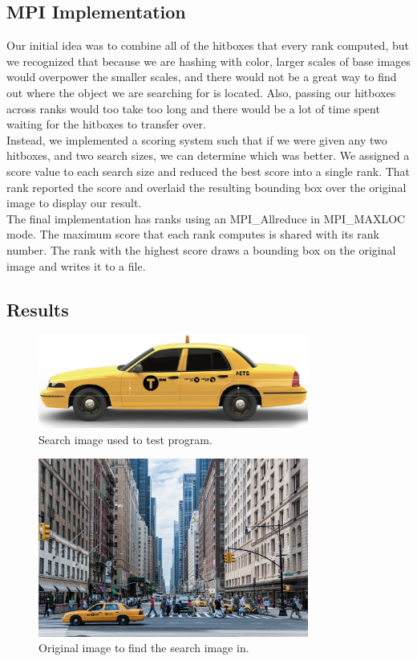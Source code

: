 \documentclass[10pt, journal]{vgtc}                %
\begin{document}
\subsection{MPI Implementation}
\begin{flushleft}
Our initial idea was to combine all of the hitboxes that every rank computed, but we recognized that because we are hashing with color, larger scales of base images would overpower the smaller scales, and there would not be a great way to find out where the object we are searching for is located. Also, passing our hitboxes across ranks would too take too long and there would be a lot of time spent waiting for the hitboxes to transfer over. \\
Instead, we implemented a scoring system such that if we were given any two hitboxes, and two search sizes, we can determine which was better. We assigned a score value to each search size and reduced the best score into a single rank. That rank reported the score and overlaid the resulting bounding box over the original image to display our result. \\\smallskip
The final implementation has ranks using an MPI\_Allreduce in MPI\_MAXLOC mode. The maximum score that each rank computes is shared with its rank number. The rank with the highest score draws a bounding box on the original image and writes it to a file.
\end{flushleft}
\subsection{Results}


\begin{figure}[h!]
	\centering
	\includegraphics[width=3.5in]{taxi_cab.png}
	\caption{Search image used to test program.}
\end{figure}

\begin{figure}[h!]
	\centering
	\includegraphics[width=3.5in]{nyc_streets.png}
	\caption{Original image to find the search image in.}
\end{figure}
\end{document}
